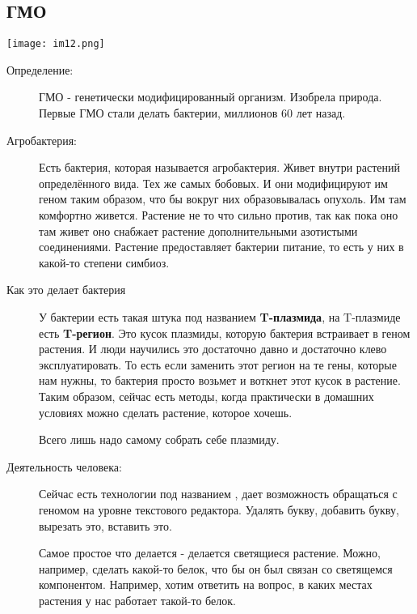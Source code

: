 \subsection{ГМО}
\texttt{[image: im12.png]}
\begin{description}
\item[Определение:]
ГМО - генетически модифицированный организм. Изобрела природа. 
Первые ГМО стали делать бактерии, миллионов 60 лет назад. 

\item[Агробактерия:]
Есть бактерия, которая называется агробактерия. Живет внутри 
растений определённого вида. Тех же 
самых бобовых. И они модифицируют им геном таким образом, 
что бы вокруг них образовывалась опухоль. 
Им там комфортно живется. Растение
не то что сильно против, так как пока оно
там живет оно снабжает
растение дополнительными азотистыми соединениями. Растение
предоставляет бактерии питание, то есть
у них в какой-то степени симбиоз. 

\item[Как это делает бактерия]
 У бактерии есть такая штука под названием \textbf{T-плазмида}, на T-плазмиде есть
\textbf{T-регион}. Это кусок плазмиды, которую бактерия
встраивает в геном растения. И люди научились это
достаточно давно и достаточно клево эксплуатировать. То есть
если заменить этот регион на те гены, которые нам нужны, то бактерия просто возьмет
и воткнет этот кусок в растение. Таким образом,
сейчас есть методы, когда практически в домашних условиях
можно сделать растение, которое хочешь.

Всего лишь надо самому собрать себе плазмиду.

\item[Деятельность человека:]
Сейчас есть технологии под названием \TODO%
, дает
возможность обращаться с геномом на уровне текстового редактора.
Удалять букву, добавить букву, вырезать это,
вставить это.

Самое простое что делается - делается
светящиеся растение. Можно, например, сделать
какой-то белок, что бы он был связан со светящемся
компонентом. Например, хотим
ответить на вопрос, в каких местах
растения у нас работает такой-то белок.
\end{description} 

